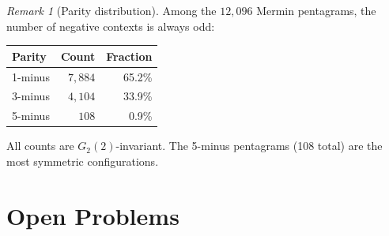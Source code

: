 \documentclass[11pt,a4paper]{article}
\theoremstyle{remark}
\newtheorem{remark}[theorem]{Remark}
\begin{document}
\begin{remark}[Parity distribution]
\label{rem:parity-dist}
Among the $12{,}096$ Mermin pentagrams, the number of negative contexts
is always odd:
\begin{center}
\begin{tabular}{l r r}
\toprule
\textbf{Parity} & \textbf{Count} & \textbf{Fraction} \\
\midrule
1-minus & $7{,}884$ & 65.2\% \\
3-minus & $4{,}104$ & 33.9\% \\
5-minus & $108$ & 0.9\% \\
\bottomrule
\end{tabular}
\end{center}
All counts are $G_2(2)$-invariant. The 5-minus pentagrams (108 total)
are the most symmetric configurations.
\end{remark}

\section{Open Problems}
\label{sec:open}
\end{document}
